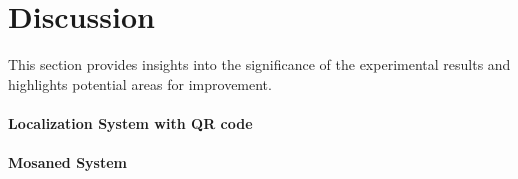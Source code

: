 \section{Discussion}

This section provides insights into the significance of the experimental results and highlights potential areas for improvement.

\paragraph{Localization System with QR code}

\paragraph{Mosaned System}
